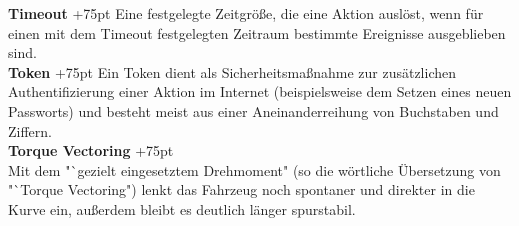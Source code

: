 \documentclass[fontsize = 12pt, paper = a4]{scrreprt}
\begin{document}
\textbf{Timeout}
\hangindent+75pt 
\hspace*{6mm}
Eine festgelegte Zeitgröße, die eine Aktion auslöst, wenn für einen mit dem Timeout festgelegten Zeitraum bestimmte Ereignisse ausgeblieben sind.\\

\textbf{Token}
\hangindent+75pt  
\hspace*{12mm}
Ein Token dient als Sicherheitsmaßnahme zur zusätzlichen Authentifizierung einer Aktion im Internet (beispielsweise dem Setzen eines neuen Passworts) und besteht meist aus einer Aneinanderreihung von Buchstaben und Ziffern.\\

\textbf{Torque Vectoring}
\hangindent+75pt  \\
Mit dem "`gezielt eingesetztem Drehmoment" (so die wörtliche Übersetzung von "`Torque Vectoring") lenkt das Fahrzeug noch spontaner und direkter in die Kurve ein, außerdem bleibt es deutlich länger spurstabil.\\
\end{document}

